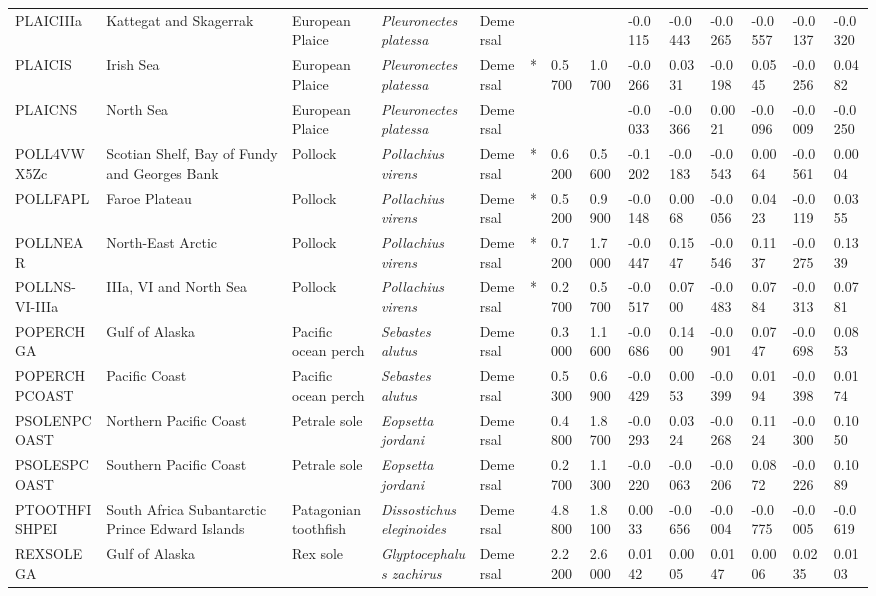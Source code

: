 \begin{longtable}{p{2.6cm}p{1.9cm}p{1.7cm}p{1.6cm}p{1cm}p{0.3cm}p{1cm}p{1cm}p{1cm}p{1.1cm}p{1cm}p{1.1cm}p{1cm}p{1.1cm}}
  PLAICIIIa & Kattegat and Skagerrak & European Plaice & \textit{Pleuronectes platessa} & Demersal &  &  &  & -0.0115 & -0.0443 & -0.0265 & -0.0557 & -0.0137 & -0.0320 \\ 
  PLAICIS & Irish Sea & European Plaice & \textit{Pleuronectes platessa} & Demersal & * & 0.5700 & 1.0700 & -0.0266 & 0.0331 & -0.0198 & 0.0545 & -0.0256 & 0.0482 \\ 
  PLAICNS & North Sea & European Plaice & \textit{Pleuronectes platessa} & Demersal &  &  &  & -0.0033 & -0.0366 & 0.0021 & -0.0096 & -0.0009 & -0.0250 \\ 
  POLL4VWX5Zc & Scotian Shelf, Bay of Fundy and Georges Bank & Pollock & \textit{Pollachius virens} & Demersal & * & 0.6200 & 0.5600 & -0.1202 & -0.0183 & -0.0543 & 0.0064 & -0.0561 & 0.0004 \\ 
  POLLFAPL & Faroe Plateau & Pollock & \textit{Pollachius virens} & Demersal & * & 0.5200 & 0.9900 & -0.0148 & 0.0068 & -0.0056 & 0.0423 & -0.0119 & 0.0355 \\ 
  POLLNEAR & North-East Arctic & Pollock & \textit{Pollachius virens} & Demersal & * & 0.7200 & 1.7000 & -0.0447 & 0.1547 & -0.0546 & 0.1137 & -0.0275 & 0.1339 \\ 
  POLLNS-VI-IIIa & IIIa, VI and North Sea & Pollock & \textit{Pollachius virens} & Demersal & * & 0.2700 & 0.5700 & -0.0517 & 0.0700 & -0.0483 & 0.0784 & -0.0313 & 0.0781 \\ 
  POPERCHGA & Gulf of Alaska & Pacific ocean perch & \textit{Sebastes alutus} & Demersal &   & 0.3000 & 1.1600 & -0.0686 & 0.1400 & -0.0901 & 0.0747 & -0.0698 & 0.0853 \\ 
  POPERCHPCOAST & Pacific Coast & Pacific ocean perch & \textit{Sebastes alutus} & Demersal &   & 0.5300 & 0.6900 & -0.0429 & 0.0053 & -0.0399 & 0.0194 & -0.0398 & 0.0174 \\ 
  PSOLENPCOAST & Northern Pacific Coast & Petrale sole & \textit{Eopsetta jordani} & Demersal &   & 0.4800 & 1.8700 & -0.0293 & 0.0324 & -0.0268 & 0.1124 & -0.0300 & 0.1050 \\ 
  PSOLESPCOAST & Southern Pacific Coast & Petrale sole & \textit{Eopsetta jordani} & Demersal &   & 0.2700 & 1.1300 & -0.0220 & -0.0063 & -0.0206 & 0.0872 & -0.0226 & 0.1089 \\ 
  PTOOTHFISHPEI & South Africa Subantarctic Prince Edward Islands & Patagonian toothfish & \textit{Dissostichus eleginoides} & Demersal &   & 4.8800 & 1.8100 & 0.0033 & -0.0656 & -0.0004 & -0.0775 & -0.0005 & -0.0619 \\ 
  REXSOLEGA & Gulf of Alaska & Rex sole & \textit{Glyptocephalus zachirus} & Demersal &   & 2.2200 & 2.6000 & 0.0142 & 0.0005 & 0.0147 & 0.0006 & 0.0235 & 0.0103 \\ 

\end{longtable}

